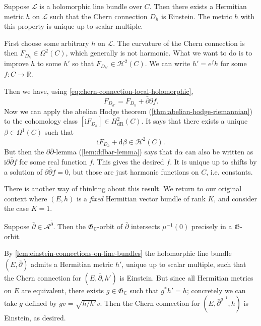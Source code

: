 \documentclass[12pt,letterpaper,reqno]{article}
\numberwithin{equation}{section}
\newcommand{\fG}{{\mathfrak G}}
\newcommand{\cL}{\ensuremath{\mathcal L}}
\newcommand{\cH}{\ensuremath{\mathcal H}}
\newcommand{\cA}{\ensuremath{\mathcal A}}
\newcommand{\R}{\ensuremath{\mathbb R}}
\newcommand{\C}{\ensuremath{\mathbb C}}
\newcommand{\I}{{\mathrm i}}
\newcommand{\de}{\mathrm{d}}
\newcommand{\dR}{\mathrm{dR}}
\newcommand{\ti}[1]{\textit{#1}}
\begin{document}
\begin{lem} \label{lem:einstein-connections-on-line-bundles}
Suppose $\cL$ is a holomorphic line bundle over $C$. Then there
exists a Hermitian metric $h$ on $\cL$ such that the Chern
connection $D_h$ is Einstein. The metric $h$ with this property
is unique up to scalar multiple.
\end{lem}
\begin{pf}
First choose some arbitrary $h$ on $\cL$. The curvature of the Chern
connection is then $F_{D_h} \in \Omega^2(C)$, 
which generally is not harmonic. What we want to do is to
improve $h$ to some $h'$ so that $F_{D_{h'}} \in \cH^2(C)$.
We can write $h' = e^f h$ for some $f: C \to \R$.

Then we have, using \eqref{eq:chern-connection-local-holomorphic},
\begin{equation}
  F_{D_{h'}} = F_{D_h} + \bar\partial \partial f.
\end{equation}
Now we can apply the
abelian Hodge theorem (\autoref{thm:abelian-hodge-riemannian})
to the cohomology class $[\I F_{D_h}] \in H^{2}_\dR(C)$.
It says that there exists a unique $\beta \in \Omega^1(C)$
such that
\begin{equation}
 \I F_{D_h} + \de \beta \in \cH^2(C).
\end{equation}
But then the $\partial \bar\partial$-lemma (\autoref{lem:ddbar-lemma})
says that $\de \alpha$ can also be written as
$\I \partial \bar\partial f$ for some real function $f$.
This gives the desired $f$. It is unique up to shifts by
a solution of $\partial \bar\partial f = 0$, but those
are just harmonic functions on $C$, i.e. constants.
\end{pf}

There is another way of thinking about this result.
We return to our original context where $(E,h)$ is a \ti{fixed}
Hermitian vector bundle of rank $K$, and consider the case $K=1$.

\begin{cor} 
Suppose $\bar\partial \in \cA^{\bar\partial}$.
Then the $\fG_\C$-orbit of $\bar\partial$ 
intersects $\mu^{-1}(0)$ precisely
in a $\fG$-orbit.
\end{cor}

\begin{pf} By \autoref{lem:einstein-connections-on-line-bundles} 
the holomorphic line bundle $(E,\bar\partial)$ admits
a Hermitian metric $h'$, unique up to scalar multiple, 
such that the Chern connection
for $(E, \bar\partial, h')$ is Einstein.
But since all Hermitian metrics on $E$ are equivalent, there
exists $g \in \fG_\C$ such that $g^* h' = h$;
concretely we can take $g$ defined by $g v = \sqrt{h/h'} v$.
Then the Chern connection for
$(E,\bar\partial^{g^{-1}}, h)$ is Einstein, as desired.
\end{pf}
\end{document}
